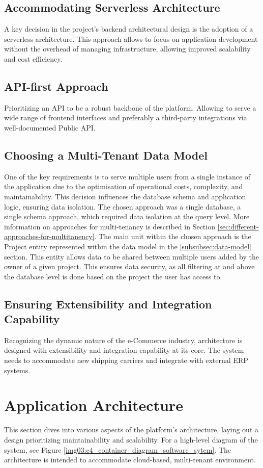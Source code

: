 \subsection{Accommodating Serverless Architecture}
A key decision in the project's backend architectural design is the adoption of a serverless architecture.
This approach allows to focus on application development without the overhead of managing infrastructure, allowing improved scalability and cost efficiency.


\subsection{API-first Approach}
Prioritizing an API to be a robust backbone of the platform.
Allowing to serve a wide range of frontend interfaces and preferably a third-party integrations via well-documented Public API.


\subsection{Choosing a Multi-Tenant Data Model}
One of the key requirements is to serve multiple users from a single instance of the application due to the optimisation of operational costs, complexity, and maintainability.
This decision influences the database schema and application logic, ensuring data isolation.
The chosen approach was a single database, a single schema approach, which required data isolation at the query level. More information on approaches for multi-tenancy is described in Section \ref{sec:different-approaches-for-multitanency}.
The main unit within the chosen approach is the Project entity represented within the data model in the \ref{subsubsec:data-model} section.
This entity allows data to be shared between multiple users added by the owner of a given project.
This ensures data security, as all filtering at and above the database level is done based on the project the user has access to.


\subsection{Ensuring Extensibility and Integration Capability}
Recognizing the dynamic nature of the e-Commerce industry, architecture is designed with extensibility and integration capability at its core. 
The system needs to accommodate new shipping carriers and integrate with external \ac{ERP} systems.


\section{Application Architecture}
\label{sec:application-architecture}
This section dives into various aspects of the platform's architecture, laying out a design prioritizing maintainability and scalability. For a high-level diagram of the system, see Figure \ref{img03:c4_container_diagram_software_sytem}.
The architecture is intended to accommodate cloud-based, multi-tenant environment.

